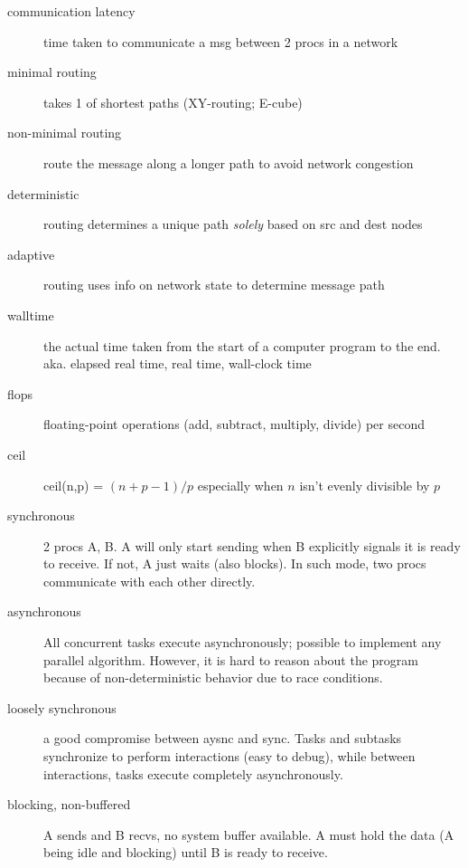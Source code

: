 \begin{description}
\item[communication latency] time taken to communicate a msg between 2 procs in a network

\item[minimal routing] takes 1 of shortest paths (XY-routing; E-cube)

\item[non-minimal routing] route the message along a longer path to avoid network congestion

\item[deterministic] routing determines a unique path \emph{solely} based on src and dest nodes

\item[adaptive] routing uses info on network state to determine message path

\item[walltime] the actual time taken from the start of a computer program to the end. aka. elapsed real time, real time, wall-clock time
\item[flops] floating-point operations (add, subtract, multiply, divide) per second
\item[ceil] ceil(n,p) = $(n + p - 1) / p$ especially when $n$ isn't evenly divisible by $p$

\item[synchronous] 2 procs A, B. A will only start sending when B explicitly signals it is ready to receive.  If not, A just waits (also blocks).  In such mode, two procs communicate with each other directly.

\item[asynchronous] All concurrent tasks execute asynchronously; possible to implement any parallel algorithm.  However, it is hard to reason about the program because of non-deterministic behavior due to race conditions.

\item[loosely synchronous] a good compromise between aysnc and sync.  Tasks and subtasks synchronize to perform interactions (easy to debug), while between interactions, tasks execute completely asynchronously.

\item[blocking, non-buffered] A sends and B recvs, no system buffer available.  A must hold the data (A being idle and blocking) until B is ready to receive.


\end{description}
